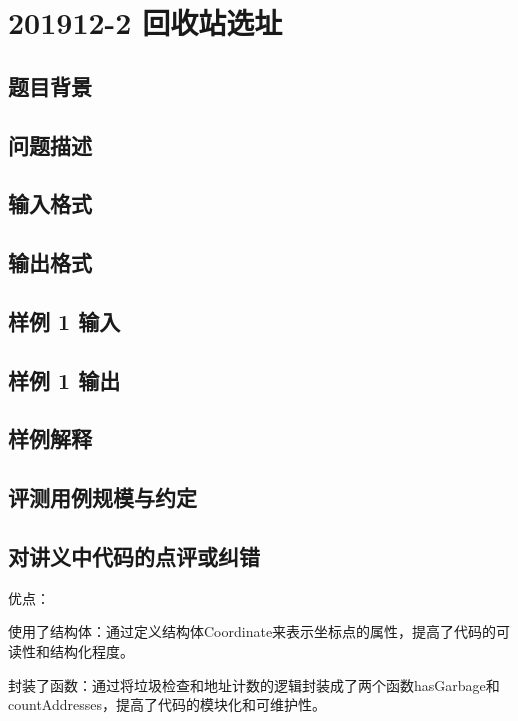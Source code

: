 \section{201912-2 回收站选址}

\subsection{题目背景}

\subsection{问题描述}

\subsection{输入格式}

\subsection{输出格式}

\subsection{样例 1 输入}

\subsection{样例 1 输出}

\subsection{样例解释}

\subsection{评测用例规模与约定}

\subsection{对讲义中代码的点评或纠错}
 
优点：

使用了结构体：通过定义结构体Coordinate来表示坐标点的属性，提高了代码的可读性和结构化程度。

封装了函数：通过将垃圾检查和地址计数的逻辑封装成了两个函数hasGarbage和countAddresses，提高了代码的模块化和可维护性。

